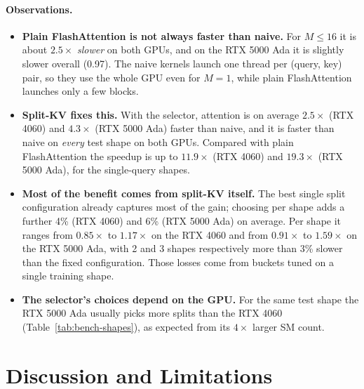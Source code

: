 \documentclass[11pt]{article}
\begin{document}
\paragraph{Observations.}
\begin{itemize}
  \item \textbf{Plain FlashAttention is not always faster than naive.} For
        $M \le 16$ it is about $2.5\times$ \emph{slower} on both GPUs, and on the
        RTX 5000 Ada it is slightly slower overall (0.97). The naive kernels launch
        one thread per (query, key) pair, so they use the whole GPU even for
        $M = 1$, while plain FlashAttention launches only a few blocks.
  \item \textbf{Split-KV fixes this.} With the selector, attention is on average
        $2.5\times$ (RTX 4060) and $4.3\times$ (RTX 5000 Ada) faster than naive, and
        it is faster than naive on \emph{every} test shape on both GPUs. Compared with
        plain FlashAttention the speedup is up to $11.9\times$ (RTX 4060) and
        $19.3\times$ (RTX 5000 Ada), for the single-query shapes.
  \item \textbf{Most of the benefit comes from split-KV itself.} The best single
        split configuration already captures most of the gain; choosing per shape
        adds a further 4\% (RTX 4060) and 6\% (RTX 5000 Ada) on average. Per shape
        it ranges from $0.85\times$ to $1.17\times$ on the RTX 4060 and from
        $0.91\times$ to $1.59\times$ on the RTX 5000 Ada, with 2 and 3 shapes
        respectively more than 3\% slower than the fixed configuration. Those
        losses come from buckets tuned on a single training shape.
  \item \textbf{The selector's choices depend on the GPU.} For the same test shape
        the RTX 5000 Ada usually picks more splits than the RTX 4060
        (Table~\ref{tab:bench-shapes}), as expected from its $4\times$ larger SM count.
\end{itemize}

\section{Discussion and Limitations}
\end{document}
